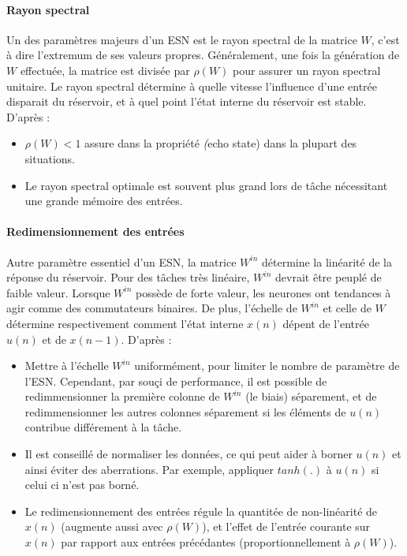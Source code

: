 \documentclass[12pt]{article}
\begin{document}
\paragraph{Rayon spectral}
Un des paramètres majeurs d'un ESN est le rayon spectral de la matrice $W$, c'est à dire l'extremum de ses valeurs propres. Généralement, une fois la génération de $W$ effectuée, la matrice est divisée par $\rho(W)$ pour assurer un rayon spectral unitaire. Le rayon spectral détermine à quelle vitesse l'influence d'une entrée disparait du réservoir, et à quel point l'état interne du réservoir est stable.\newline
D'après \cite{Lukosevicius12}:
\begin{itemize}
\item $\rho(W) < 1$ assure dans la propriété \textit(echo state) dans la plupart des situations.
\item Le rayon spectral optimale est souvent plus grand lors de tâche nécessitant une grande mémoire des entrées.
\end{itemize}

\paragraph{Redimensionnement des entrées}
Autre paramètre essentiel d'un ESN, la matrice $W^{in}$ détermine la linéarité de la réponse du réservoir. Pour des tâches très linéaire, $W^{in}$ devrait être peuplé de faible valeur. Lorsque $W^{in}$ possède de forte valeur, les neurones ont tendances à agir comme des commutateurs binaires. De plus, l'échelle de $W^{in}$ et celle de $W$ détermine respectivement comment l'état interne $x(n)$ dépent de l'entrée $u(n)$ et de $x(n-1)$.\newline
D'après \cite{Lukosevicius12}:
\begin{itemize}
\item Mettre à l'échelle $W^{in}$ uniformément, pour limiter le nombre de paramètre de l'ESN. Cependant, par souçi de performance, il est possible de redimmensionner la première colonne de $W^{in}$ (le biais) séparement, et de redimmensionner les autres colonnes séparement si les éléments de $u(n)$ contribue différement à la tâche.
\item Il est conseillé de normaliser les données, ce qui peut aider à borner $u(n)$ et ainsi éviter des aberrations. Par exemple, appliquer $tanh(.)$ à $u(n)$ si celui ci n'est pas borné.
\item Le redimensionnement des entrées régule la quantitée de non-linéarité de $x(n)$ (augmente aussi avec $\rho(W)$), et l'effet de l'entrée courante sur $x(n)$ par rapport aux entrées précédantes (proportionnellement à $\rho(W)$).
\end{itemize}
\end{document}
